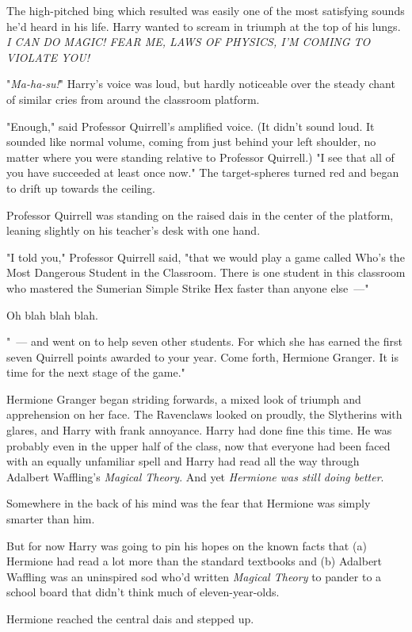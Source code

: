The high-pitched bing which resulted was easily one of the most satisfying
sounds he'd heard in his life. Harry wanted to scream in triumph at the top of
his lungs. \emph{I CAN DO MAGIC! FEAR ME, LAWS OF PHYSICS, I'M COMING TO
VIOLATE YOU!}

"\emph{Ma-ha-su!}" Harry's voice was loud, but hardly noticeable over the
steady chant of similar cries from around the classroom platform.

"Enough," said Professor Quirrell's amplified voice. (It didn't sound loud. It
sounded like normal volume, coming from just behind your left shoulder, no
matter where you were standing relative to Professor Quirrell.) "I see that all
of you have succeeded at least once now." The target-spheres turned red and
began to drift up towards the ceiling.

Professor Quirrell was standing on the raised dais in the center of the
platform, leaning slightly on his teacher's desk with one hand.

"I told you," Professor Quirrell said, "that we would play a game called Who's
the Most Dangerous Student in the Classroom. There is one student in this
classroom who mastered the Sumerian Simple Strike Hex faster than anyone
else~---"

Oh blah blah blah.

"~--- and went on to help seven other students. For which she has earned the
first seven Quirrell points awarded to your year. Come forth, Hermione Granger.
It is time for the next stage of the game."

Hermione Granger began striding forwards, a mixed look of triumph and
apprehension on her face. The Ravenclaws looked on proudly, the Slytherins with
glares, and Harry with frank annoyance. Harry had done fine this time. He was
probably even in the upper half of the class, now that everyone had been faced
with an equally unfamiliar spell and Harry had read all the way through
Adalbert Waffling's \emph{Magical Theory}. And yet \emph{Hermione was still
doing better}.

Somewhere in the back of his mind was the fear that Hermione was simply smarter
than him.

But for now Harry was going to pin his hopes on the known facts that (a)
Hermione had read a lot more than the standard textbooks and (b) Adalbert
Waffling was an uninspired sod who'd written \emph{Magical Theory} to pander to
a school board that didn't think much of eleven-year-olds.

Hermione reached the central dais and stepped up.

